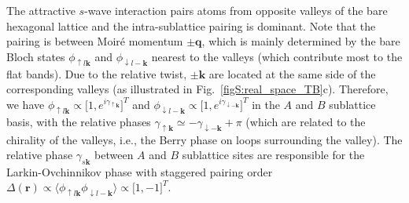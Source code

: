 \documentclass[twocolumn,english,prl,floatfix,citeautoscript,nofootinbib]{revtex4}
\begin{document}
\begin{widetext}
The attractive $s$-wave interaction pairs atoms from opposite valleys of the
bare hexagonal lattice and the intra-sublattice pairing is dominant. Note
that the pairing is between Moir\'{e} momentum $\pm \mathbf{q}$, which is
mainly determined by the bare Bloch states $\phi _{\uparrow l\mathbf{k}}$
and $\phi _{\downarrow l-\mathbf{k}}$ nearest to the valleys (which
contribute most to the flat bands). Due to the relative twist, $\pm \mathbf{k%
}$ are located at the same side of the corresponding valleys (as illustrated
in Fig.~\ref{figS:real_space_TB}c). Therefore, we have $\phi _{\uparrow l%
\mathbf{k}}\propto \lbrack 1,e^{i\gamma _{\uparrow \mathbf{k}}}]^{T}$ and $%
\phi _{\downarrow l-\mathbf{k}}\propto \lbrack 1,e^{i\gamma _{\downarrow -%
\mathbf{k}}}]^{T}$ in the $A$ and $B$ sublattice basis, with the relative
phases $\gamma _{\uparrow \mathbf{k}}\simeq -\gamma _{\downarrow -\mathbf{k}%
}+\pi $ (which are related to the chirality of the valleys, i.e., the Berry
phase on loops surrounding the valley). The relative phase $\gamma _{s%
\mathbf{k}}$ between $A$ and $B$ sublattice sites are responsible for the
Larkin-Ovchinnikov phase with staggered pairing order $\Delta (\mathbf{r}%
)\propto \langle \phi _{\uparrow l\mathbf{k}}\phi _{\downarrow l-\mathbf{k}%
}\rangle \propto \lbrack 1,-1]^{T}$.


\end{widetext}
\end{document}
